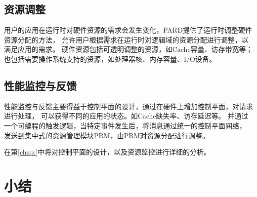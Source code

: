 \subsection{资源调整}

用户的应用在运行时对硬件资源的需求会发生变化，PARD提供了运行时调整硬件资源分配的方法，
允许用户根据需求在运行时对逻辑域的资源分配进行调整，以满足应用的需求。
硬件资源包括可透明调整的资源，如Cache容量、访存带宽等；
也包括需要操作系统支持的资源，如处理器核、内存容量、I/O设备。




\subsection{性能监控与反馈}

性能监控与反馈主要得益于控制平面的设计，通过在硬件上增加控制平面，对请求进行处理，
可以获得不同的应用的状态。如Cache缺失率、访存延迟等。
并通过一个可编程的触发逻辑，当特定事件发生后，将消息通过统一的控制平面网络，
发送到集中式的资源管理模块PRM，由PRM对资源分配进行调整。

在第\ref{chap:}中将对控制平面的设计，以及资源监控进行详细的分析。


\section{小结}

